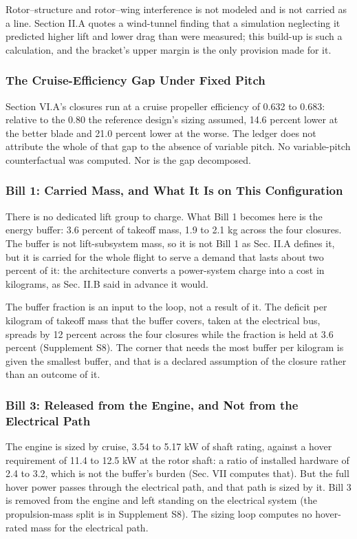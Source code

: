 \documentclass[journal]{new-aiaa}
\begin{document}
Rotor--structure and rotor--wing interference is not modeled and is not carried as a line. Section II.A quotes a wind-tunnel finding that a simulation neglecting it predicted higher lift and lower drag than were measured; this build-up is such a calculation, and the bracket's upper margin is the only provision made for it.

\subsubsection{The Cruise-Efficiency Gap Under Fixed Pitch}

Section VI.A's closures run at a cruise propeller efficiency of 0.632 to 0.683: relative to the 0.80 the reference design's sizing assumed, 14.6 percent lower at the better blade and 21.0 percent lower at the worse. The ledger does not attribute the whole of that gap to the absence of variable pitch. No variable-pitch counterfactual was computed. Nor is the gap decomposed.

\subsubsection{Bill 1: Carried Mass, and What It Is on This Configuration}

There is no dedicated lift group to charge. What Bill 1 becomes here is the energy buffer: 3.6 percent of takeoff mass, 1.9 to 2.1 kg across the four closures. The buffer is not lift-subsystem mass, so it is not Bill 1 as Sec. II.A defines it, but it is carried for the whole flight to serve a demand that lasts about two percent of it: the architecture converts a power-system charge into a cost in kilograms, as Sec. II.B said in advance it would.

The buffer fraction is an input to the loop, not a result of it. The deficit per kilogram of takeoff mass that the buffer covers, taken at the electrical bus, spreads by 12 percent across the four closures while the fraction is held at 3.6 percent (Supplement S8). The corner that needs the most buffer per kilogram is given the smallest buffer, and that is a declared assumption of the closure rather than an outcome of it.

\subsubsection{Bill 3: Released from the Engine, and Not from the Electrical Path}

The engine is sized by cruise, 3.54 to 5.17 kW of shaft rating, against a hover requirement of 11.4 to 12.5 kW at the rotor shaft: a ratio of installed hardware of 2.4 to 3.2, which is not the buffer's burden (Sec. VII computes that). But the full hover power passes through the electrical path, and that path is sized by it. Bill 3 is removed from the engine and left standing on the electrical system (the propulsion-mass split is in Supplement S8). The sizing loop computes no hover-rated mass for the electrical path.
\end{document}
